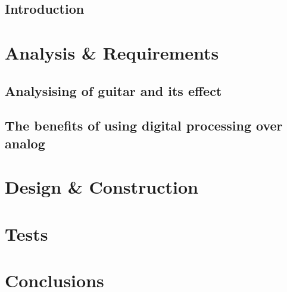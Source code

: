\glsresetall
 \graphicspath{{figures/analysing/}}
\chapter{Introduction}

\part{Analysis \& Requirements}\label{pt:analysis} \glsresetall
 \graphicspath{{figures/analysing/}}
 \chapter{Analysising of guitar and its effect}\label{ch:analysing}
 \label{sec:electric_guitar_theory} 
 \label{sec:effects}
\label{sec:platform_comparing}

 \label{sec:FPGA}

\chapter{The benefits of using digital processing over analog}

 \label{sec:digital_vs_analog}

\part{Design \& Construction}\label{pt:design} 
 
%
\part{Tests}\label{pt:tests} 
\part{Conclusions}\label{pt:conclusions} 
%

